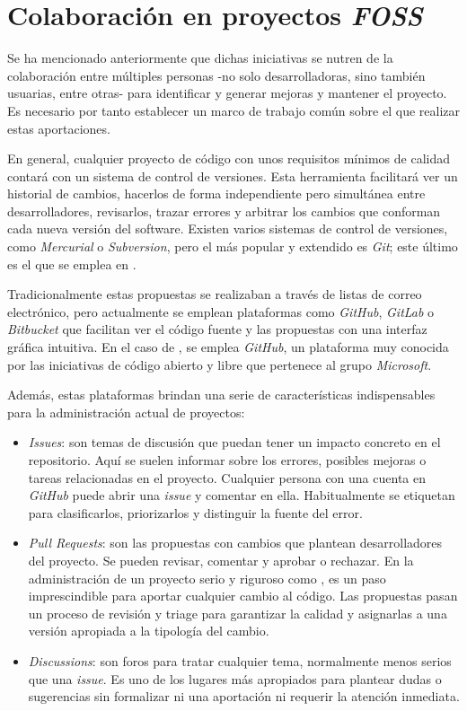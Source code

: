 \section{Colaboración en proyectos \textit{FOSS}} \label{sct:colaboracion_FOSS}

Se ha mencionado anteriormente que dichas iniciativas se nutren de la colaboración entre múltiples personas -no solo desarrolladoras, sino también usuarias, entre otras- para identificar y generar mejoras y mantener el proyecto. Es necesario por tanto establecer un marco de trabajo común sobre el que realizar estas aportaciones.

En general, cualquier proyecto de código con unos requisitos mínimos de calidad contará con un sistema de control de versiones. Esta herramienta facilitará ver un historial de cambios, hacerlos de forma independiente pero simultánea entre desarrolladores, revisarlos, trazar errores y arbitrar los cambios que conforman cada nueva versión del software. Existen varios sistemas de control de versiones, como \textit{Mercurial} o \textit{Subversion}, pero el más popular y extendido es \textit{Git}; este último es el que se emplea en \pvlibpy.

Tradicionalmente estas propuestas se realizaban a través de listas de correo electrónico, pero actualmente se emplean plataformas como \textit{GitHub}, \textit{GitLab} o \textit{Bitbucket} que facilitan ver el código fuente y las propuestas con una interfaz gráfica intuitiva. En el caso de \pvlibpy, se emplea \textit{GitHub}, un plataforma muy conocida por las iniciativas de código abierto y libre que pertenece al grupo \textit{Microsoft}.

Además, estas plataformas brindan una serie de características indispensables para la administración actual de proyectos:

\begin{itemize}
    \item \textit{Issues}: son temas de discusión que puedan tener un impacto concreto en el repositorio. Aquí se suelen informar sobre los errores, posibles mejoras o tareas relacionadas en el proyecto. Cualquier persona con una cuenta en \textit{GitHub} puede abrir una \textit{issue} y comentar en ella. Habitualmente se etiquetan para clasificarlos, priorizarlos y distinguir la fuente del error.
    \item \textit{Pull Requests}: son las propuestas con cambios que plantean desarrolladores del proyecto. Se pueden revisar, comentar y aprobar o rechazar. En la administración de un proyecto serio y riguroso como \pvlibpy, es un paso imprescindible para aportar cualquier cambio al código. Las propuestas pasan un proceso de revisión y triage para garantizar la calidad y asignarlas a una versión apropiada a la tipología del cambio.
    \item \textit{Discussions}: son foros para tratar cualquier tema, normalmente menos serios que una \textit{issue}. Es uno de los lugares más apropiados para plantear dudas o sugerencias sin formalizar ni una aportación ni requerir la atención inmediata.
\end{itemize}

